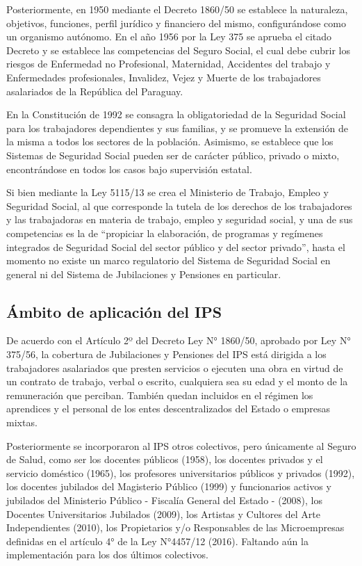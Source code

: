 Posteriormente, en 1950 mediante el Decreto 1860/50 se establece la naturaleza, objetivos, funciones, perfil jurídico y financiero del mismo, configurándose como un organismo autónomo. En el año 1956 por la Ley 375 se aprueba el citado Decreto y se establece las competencias del Seguro Social, el cual debe cubrir los riesgos de Enfermedad no Profesional, Maternidad, Accidentes del trabajo y Enfermedades profesionales, Invalidez, Vejez y Muerte de los trabajadores asalariados de la República del Paraguay.

En la Constitución de 1992 se consagra la obligatoriedad de la Seguridad Social para los trabajadores dependientes y sus familias, y se promueve la extensión de la misma a todos los sectores de la población. Asimismo, se establece que los Sistemas de Seguridad Social pueden ser de carácter público, privado o mixto, encontrándose en todos los casos bajo supervisión estatal.

Si bien mediante la Ley 5115/13 se crea el Ministerio de Trabajo, Empleo y Seguridad Social, al que corresponde la tutela de los derechos de los trabajadores y las trabajadoras en materia de trabajo, empleo y seguridad social, y una de sus competencias es la de “propiciar la elaboración, de programas y regímenes integrados de Seguridad Social del sector público y del sector privado”, hasta el momento no existe un marco regulatorio del Sistema de Seguridad Social en general ni del Sistema de Jubilaciones y Pensiones en particular. 

\subsection{Ámbito de aplicación del IPS}

De acuerdo con el Artículo 2º del Decreto Ley N° 1860/50, aprobado por Ley N° 375/56, la cobertura de Jubilaciones y Pensiones del IPS está dirigida a los trabajadores asalariados que presten servicios o ejecuten una obra en virtud de un contrato de trabajo, verbal o escrito, cualquiera sea su edad y el monto de la remuneración que perciban. También quedan incluidos en el régimen los aprendices y el personal de los entes descentralizados del Estado o empresas mixtas. 

Posteriormente se incorporaron al IPS otros colectivos, pero únicamente al Seguro de Salud, como ser los docentes públicos (1958), los docentes privados y el servicio doméstico (1965), los profesores universitarios públicos y privados (1992), los docentes jubilados del Magisterio Público (1999) y funcionarios activos y jubilados del Ministerio Público - Fiscalía General del Estado - (2008), los Docentes Universitarios Jubilados (2009), los Artistas y Cultores del Arte Independientes (2010), los Propietarios y/o Responsables de las Microempresas definidas en el artículo 4° de la Ley N°4457/12 (2016).  Faltando aún la implementación para los dos últimos colectivos.

